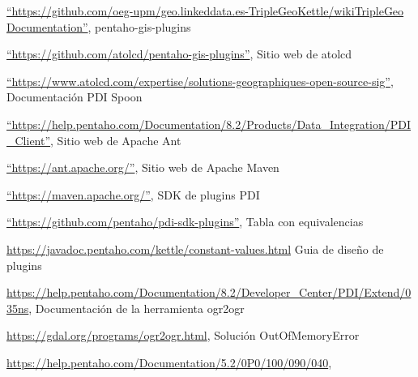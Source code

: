 \begin{thebibliography}{99}
        \href{https://github.com/oeg-upm/geo.linkeddata.es-TripleGeoKettle/wiki}{``https://github.com/oeg-upm/geo.linkeddata.es-TripleGeoKettle/wikiTripleGeo Documentation''},
    pentaho-gis-plugins

        \href{https://github.com/atolcd/pentaho-gis-plugins}{``https://github.com/atolcd/pentaho-gis-plugins''},
    Sitio web de atolcd

        \href{https://www.atolcd.com/expertise/solutions-geographiques-open-source-sig}{``https://www.atolcd.com/expertise/solutions-geographiques-open-source-sig''},
    Documentación PDI Spoon

        \href{https://help.pentaho.com/Documentation/8.2/Products/Data\_Integration/PDI\_Client}{``https://help.pentaho.com/Documentation/8.2/Products/Data\_Integration/PDI\_Client''},
    Sitio web de Apache Ant

        \href{https://ant.apache.org/}{``https://ant.apache.org/''},
    Sitio web de Apache Maven

        \href{https://maven.apache.org/}{``https://maven.apache.org/''},
    SDK de plugins PDI

        \href{https://github.com/pentaho/pdi-sdk-plugins}{``https://github.com/pentaho/pdi-sdk-plugins''},
    Tabla con equivalencias

        \href{https://javadoc.pentaho.com/kettle/constant-values.html#org.pentaho.di.core.row.ValueMetaInterface.TYPE_INTEGER}{https://javadoc.pentaho.com/kettle/constant-values.html}
    Guia de diseño de plugins

        \href{https://help.pentaho.com/Documentation/8.2/Developer_Center/PDI/Extend/035}{https://help.pentaho.com/Documentation/8.2/Developer\_Center/PDI/Extend/035ns},
    Documentación de la herramienta ogr2ogr

        \href{https://gdal.org/programs/ogr2ogr.html}{https://gdal.org/programs/ogr2ogr.html},
    Solución OutOfMemoryError

        \href{https://help.pentaho.com/Documentation/5.2/0P0/100/090/040}{https://help.pentaho.com/Documentation/5.2/0P0/100/090/040},

\end{thebibliography}
